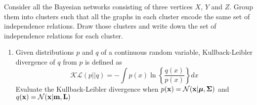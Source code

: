 \documentclass{amsmlaj}
\begin{document}

\begin{problem}
Consider all the Bayesian networks consisting of three vertices $X$, $Y$ and $Z$. Group them into clusters such that all the graphs in each cluster encode the same set of independence relations. Draw those clusters and write down the set of independence relations for each cluster.
\end{problem}

\begin{problem}
\begin{enumerate}
 \item Given distributions $p$ and $q$ of a continuous random variable, Kullback-Leibler divergence of $q$ from $p$ is defined as
    \begin{equation}
    \mathcal{KL}(p||q)= - \int {p(x)\ln \left\{ {\frac{{q(x)}}{{p(x)}}} \right\}} dx \nonumber
    \end{equation}
    Evaluate the Kullback-Leibler divergence when $p(\bm{\mathbf{x}})=\mathcal{N}(\bm{\mathbf{x}}|\bm{\mathbf{\mu}},\bm{\mathbf{\Sigma}})$ and $q(\bm{\mathbf{x}})=\mathcal{N}(\bm{\mathbf{x}}|\bm{\mathbf{m}},\bm{\mathbf{L}})$


\end{enumerate}
\end{problem}
\end{document}
